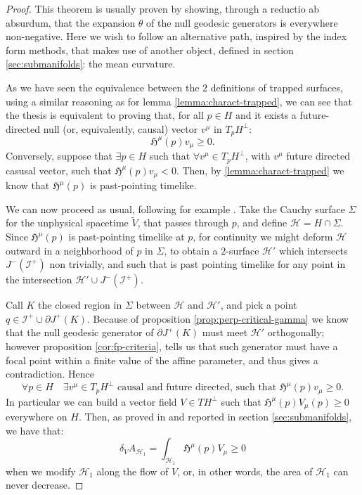 \begin{proof}
	This theorem is usually proven by showing, through a reductio ab absurdum, that the expansion \(\theta\) of the null geodesic generators is everywhere non-negative. Here we wish to follow an alternative path, inspired by the index form methods, that makes use of another object, defined in section \ref{sec:submanifolds}: the mean curvature.
	
	As we have seen the equivalence between the \(2\) definitions of trapped surfaces, %
	using a similar reasoning as for lemma \ref{lemma:charact-trapped}, we can see that the thesis is equivalent to proving that, for all \(p \in H\) and it exists a future-directed null (or, equivalently, causal) vector \(v^{\mu}\) in \(T_pH^{\perp}\):
	\[
	\mathfrak{H}^{\mu}(p)v_{\mu} \ge 0.
	\]
	Conversely, suppose that \(\exists p\in H\) such that \(\forall v^{\mu} \in T_pH^{\perp}\), with \(v^{\mu} \) future directed casusal vector, such that \(\mathfrak{H}^{\mu}(p)v_{\mu} < 0.\) Then, by \ref{lemma:charact-trapped} we know that \(\mathfrak{H}^{\mu}(p)\) is past-pointing timelike.
	
	We can now proceed as usual, following for example \cite{wald2010general}. Take the Cauchy surface \(\Sigma\) for the unphysical spacetime \(\tilde{V}\), that passes through \(p\), and define \(\mathscr{H} = H \cap \Sigma\). Since \(\mathfrak{H}^{\mu}(p)\) is past-pointing timelike at \(p\), for continuity we might deform \(\mathscr{H}\) outward in a neighborhood of \(p\) in \(\Sigma\), to obtain a \(2\)-surface \(\mathscr{H}'\) which intersects \(J^-(\mathscr{I}^+)\) non trivially, and such that is past pointing timelike for any point in the intersection \(\mathscr{H}' \cup J^-(\mathscr{I}^+)\).
	
	Call \(K\) the closed region in \(\Sigma\) between \(\mathscr{H}\) and \(\mathscr{H}'\), and pick a point \(q \in \mathscr{I}^+ \cup \partial J^+(K)\). Because of proposition \ref{prop:perp-critical-gamma} we know that the null geodesic generator of \(\partial J^+(K)\) must meet \(\mathscr{H}'\) orthogonally; however proposition \ref{cor:fp-criteria}, tells us that such generator must have a focal point within a finite value of the affine parameter, and thus gives a contradiction. Hence 
	\[
	\forall p \in H \quad \exists v^{\mu} \in T_pH^{\perp} \text{ causal and future directed, such that }  \mathfrak{H}^{\mu}(p)v_{\mu} \ge 0.
	\]
	In particular we can build a vector field \(V \in TH^{\perp}\) such that \(\mathfrak{H}^{\mu}(p)V_{\mu}(p) \ge 0\) everywhere on \(H\).
	Then, as proved in \cite{kriele1999spacetime} and reported in section \ref{sec:submanifolds}, we have that:
	\begin{equation*}
		\delta_VA_{\mathscr{H}_1} = \int_{\mathscr{H}_1} \mathfrak{H}^{\mu}(p)V_{\mu} \ge 0
	\end{equation*}
	when we modify \(\mathscr{H}_1\) along the flow of \(V\), or, in other words, the area of \(\mathscr{H}_1\) can never decrease.
\end{proof}